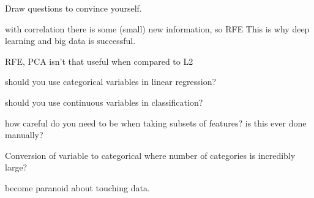 Draw questions to convince yourself. 

with correlation there is some (small) new information, so 
RFE
This is why deep learning and big data is successful. 

RFE, PCA isn't that useful when compared to L2 

should you use categorical variables in linear regression?

should you use continuous variables in classification?

how careful do you need to be when taking subsets of features?
is this ever done manually?

Conversion of variable to categorical where number of categories is incredibly large?

become paranoid about touching data. 